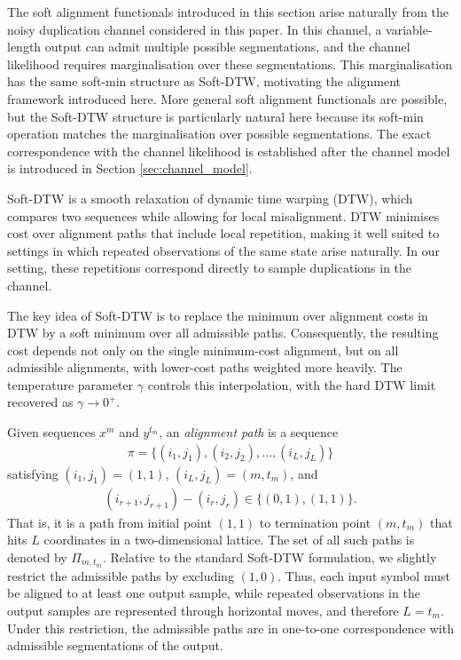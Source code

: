 \documentclass[onecolumn]{IEEEtran}
\theoremstyle{definition}
\begin{document}
{
The soft alignment functionals introduced in this section arise naturally
from the noisy duplication channel considered in this paper. In this channel,
a variable-length output can admit multiple possible segmentations, and the
channel likelihood requires marginalisation over these segmentations. This
marginalisation has the same soft-min structure as Soft-DTW, motivating the
alignment framework introduced here. More general soft alignment functionals
are possible, but the Soft-DTW structure is particularly natural here because
its soft-min operation matches the marginalisation over possible segmentations.
The exact correspondence with the channel likelihood is established after the
channel model is introduced
in Section \ref{sec:channel_model}.}

Soft-DTW is a smooth relaxation of dynamic time warping (DTW), which compares
two sequences while allowing for local misalignment. DTW minimises cost over
alignment paths that include local repetition, making it well suited to
settings in which repeated observations of the same state arise naturally.
In our setting, these repetitions correspond directly to sample duplications
in the channel.

The key idea of Soft-DTW is to replace the minimum over alignment costs in DTW
by a soft minimum over all admissible paths. Consequently, the resulting cost
depends not only on the single minimum-cost alignment, but on all admissible
alignments, with lower-cost paths weighted more heavily. The temperature
parameter \(\gamma\) controls this interpolation, with the hard DTW limit
recovered as \(\gamma\to0^+\).

Given sequences \(x^m\) and \(y^{t_m}\), an {\em alignment path} is a sequence
\begin{align*}
    \pi = \{(i_1,j_1), (i_2,j_2),\ldots,(i_L,j_L)\}
\end{align*}
satisfying \((i_1,j_1) = (1,1)\), \((i_L,j_L) = (m,t_m)\), and
\begin{align*}
    (i_{r+1},j_{r+1}) - (i_r,j_r) \in
        {\{(0,1),(1,1)\}}.
    \end{align*}
That is, it is a path from initial point $(1,1)$ to termination point
$(m,t_m)$ that hits $L$ coordinates in a two-dimensional lattice. The set of
all such paths is denoted by \(\Pi_{m,t_m}\). Relative to the standard
Soft-DTW formulation, we slightly restrict the admissible paths by excluding
\((1,0)\). Thus, each input symbol must be aligned to at least one output
sample, while repeated observations in the output samples are represented
through horizontal moves, and therefore $L=t_m$.
{Under this restriction, the admissible paths are in
one-to-one correspondence with admissible segmentations of the output.}
\end{document}
